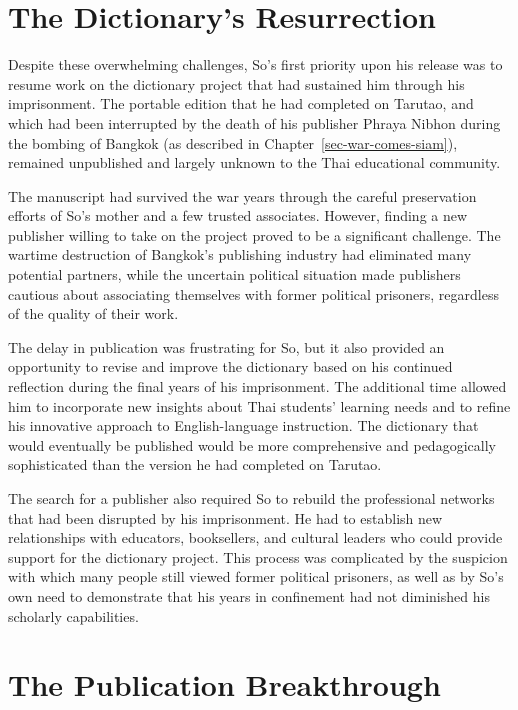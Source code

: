 \documentclass[
  Letterpaper,
]{scrbook}
\begin{document}
\section{The Dictionary's
Resurrection}\label{the-dictionarys-resurrection}

Despite these overwhelming challenges, So's first priority upon his
release was to resume work on the dictionary project that had sustained
him through his imprisonment. The portable edition that he had completed
on Tarutao, and which had been interrupted by the death of his publisher
Phraya Nibhon during the bombing of Bangkok (as described in
Chapter~\ref{sec-war-comes-siam}), remained unpublished and largely
unknown to the Thai educational community.

The manuscript had survived the war years through the careful
preservation efforts of So's mother and a few trusted associates.
However, finding a new publisher willing to take on the project proved
to be a significant challenge. The wartime destruction of Bangkok's
publishing industry had eliminated many potential partners, while the
uncertain political situation made publishers cautious about associating
themselves with former political prisoners, regardless of the quality of
their work.

The delay in publication was frustrating for So, but it also provided an
opportunity to revise and improve the dictionary based on his continued
reflection during the final years of his imprisonment. The additional
time allowed him to incorporate new insights about Thai students'
learning needs and to refine his innovative approach to English-language
instruction. The dictionary that would eventually be published would be
more comprehensive and pedagogically sophisticated than the version he
had completed on Tarutao.

The search for a publisher also required So to rebuild the professional
networks that had been disrupted by his imprisonment. He had to
establish new relationships with educators, booksellers, and cultural
leaders who could provide support for the dictionary project. This
process was complicated by the suspicion with which many people still
viewed former political prisoners, as well as by So's own need to
demonstrate that his years in confinement had not diminished his
scholarly capabilities.

\section{The Publication
Breakthrough}\label{the-publication-breakthrough}
\end{document}
